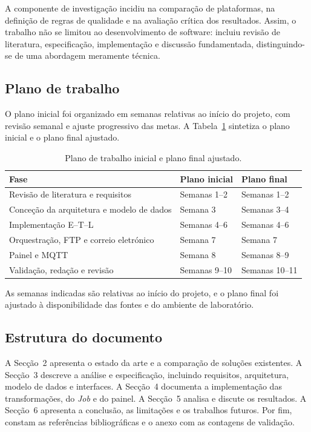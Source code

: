 \documentclass[11pt,a4paper]{article}
\begin{document}
A componente de investigação incidiu na comparação de plataformas, na definição de regras de qualidade e na avaliação crítica dos resultados. Assim, o trabalho não se limitou ao desenvolvimento de software: incluiu revisão de literatura, especificação, implementação e discussão fundamentada, distinguindo-se de uma abordagem meramente técnica.

\subsection{Plano de trabalho}
O plano inicial foi organizado em semanas relativas ao início do projeto, com revisão semanal e ajuste progressivo das metas. A Tabela~\ref{tab:plano} sintetiza o plano inicial e o plano final ajustado.

\begin{table}[H]
\centering
\small
\begin{tabular}{|l|l|l|}
\hline
Fase & Plano inicial & Plano final \\ \hline
Revisão de literatura e requisitos & Semanas 1--2 & Semanas 1--2 \\ \hline
Conceção da arquitetura e modelo de dados & Semana 3 & Semanas 3--4 \\ \hline
Implementação E--T--L & Semanas 4--6 & Semanas 4--6 \\ \hline
Orquestração, FTP e correio eletrónico & Semana 7 & Semana 7 \\ \hline
Painel e MQTT & Semana 8 & Semanas 8--9 \\ \hline
Validação, redação e revisão & Semanas 9--10 & Semanas 10--11 \\ \hline
\end{tabular}
\caption{Plano de trabalho inicial e plano final ajustado.}
\label{tab:plano}
\end{table}

As semanas indicadas são relativas ao início do projeto, e o plano final foi ajustado à disponibilidade das fontes e do ambiente de laboratório.

\subsection{Estrutura do documento}
A Secção~2 apresenta o estado da arte e a comparação de soluções existentes. A Secção~3 descreve a análise e especificação, incluindo requisitos, arquitetura, modelo de dados e interfaces. A Secção~4 documenta a implementação das transformações, do \textit{Job} e do painel. A Secção~5 analisa e discute os resultados. A Secção~6 apresenta a conclusão, as limitações e os trabalhos futuros. Por fim, constam as referências bibliográficas e o anexo com as contagens de validação.
\end{document}
